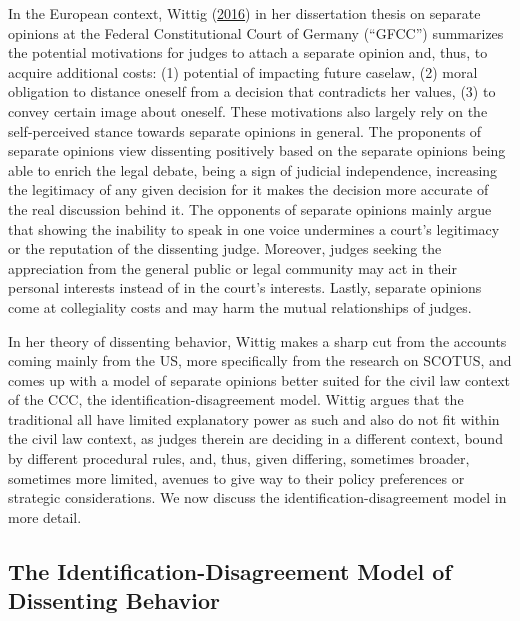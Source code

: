 \documentclass[
  11pt,
]{article}
\begin{document}
In the European context, Wittig
(\protect\hyperlink{ref-wittigOccurrenceSeparateOpinions2016}{2016}) in
her dissertation thesis on separate opinions at the Federal
Constitutional Court of Germany (``GFCC'') summarizes the potential
motivations for judges to attach a separate opinion and, thus, to
acquire additional costs: (1) potential of impacting future caselaw, (2)
moral obligation to distance oneself from a decision that contradicts
her values, (3) to convey certain image about oneself. These motivations
also largely rely on the self-perceived stance towards separate opinions
in general. The proponents of separate opinions view dissenting
positively based on the separate opinions being able to enrich the legal
debate, being a sign of judicial independence, increasing the legitimacy
of any given decision for it makes the decision more accurate of the
real discussion behind it. The opponents of separate opinions mainly
argue that showing the inability to speak in one voice undermines a
court's legitimacy or the reputation of the dissenting judge. Moreover,
judges seeking the appreciation from the general public or legal
community may act in their personal interests instead of in the court's
interests. Lastly, separate opinions come at collegiality costs and may
harm the mutual relationships of judges.

In her theory of dissenting behavior, Wittig makes a sharp cut from the
accounts coming mainly from the US, more specifically from the research
on SCOTUS, and comes up with a model of separate opinions better suited
for the civil law context of the CCC, the identification-disagreement
model. Wittig argues that the traditional all have limited explanatory
power as such and also do not fit within the civil law context, as
judges therein are deciding in a different context, bound by different
procedural rules, and, thus, given differing, sometimes broader,
sometimes more limited, avenues to give way to their policy preferences
or strategic considerations. We now discuss the
identification-disagreement model in more detail.

\hypertarget{identification-disagreement}{%
\subsection{The Identification-Disagreement Model of Dissenting
Behavior}\label{identification-disagreement}}
\end{document}
